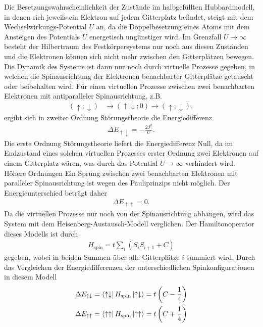 Die Besetzungswahrscheinlichkeit der Zustände im halbgefüllten Hubbardmodell, in denen sich jeweils ein Elektron auf jedem Gitterplatz befindet, steigt mit dem Wechselwirkungs-Potential $U$ an, da
die Doppelbesetzung eines Atoms mit dem Ansteigen des Potentials $U$ energetisch ungünstiger wird. Im Grenzfall $U \to \infty$ besteht der Hilbertraum des Festkörpersystems nur noch aus diesen Zuständen
und die Elektronen können sich nicht mehr zwischen den Gitterplätzen bewegen. Die Dynamik des Systems ist dann nur noch durch virtuelle Prozesse gegeben, in welchen die Spinausrichtung der Elektronen
benachbarter Gitterplätze getauscht oder beibehalten wird. Für einen virtuellen Prozesse zwischen zwei benachbarten Elektronen mit antiparalleler Spinausrichtung, z.B.
\begin{align}
  (\uparrow; \downarrow) &\to (\uparrow \downarrow ; 0) \to (\uparrow; \downarrow),
\end{align}
ergibt sich in zweiter Ordnung Störungstheorie die Energiedifferenz
\begin{align}
  \Delta E_{\uparrow \downarrow} = - \frac{2J^2}{U}.
  \label{eqn:Ediffantipar}
\end{align}
Die erste Ordnung Störungstheorie liefert die Energiedifferenz Null, da im Endzustand eines solchen virtuellen Prozesses erster Ordnung zwei Elektronen auf einem Gitterplatz wären, was durch das Potential
$U \to \infty$ verhindert wird. Höhere Ordnungen
Ein Sprung zwischen zwei benachbarten Elektronen mit paralleler Spinausrichtung ist wegen des Pauliprinzips nicht möglich.
Der Energieunterschied beträgt daher
\begin{align}
  \Delta E_{\uparrow \uparrow} = 0.
  \label{eqn:Ediffpar}
\end{align}
Da die virtuellen Prozesse nur noch von der Spinausrichtung abhängen, wird das System mit dem Heisenberg-Austausch-Modell verglichen.
Der Hamiltonoperator dieses Modells ist durch
\begin{align}
  H_\text{spin} = t \sum_{i} (S_i S_{i+1} + C)
  \label{eqn:hamiltonspincj}
\end{align}
gegeben, wobei in beiden Summen über alle Gitterplätze $i$ summiert wird. Durch das Vergleichen der Energiedifferenzen der unterschiedlichen Spinkonfigurationen in diesem Modell
\begin{align}
  \Delta E_{\uparrow \downarrow} = \bra{\uparrow \downarrow} H_\text{spin} \ket{\uparrow \downarrow} = t\left(C - \frac14\right) \\
  \Delta E_{\uparrow \uparrow} = \bra{\uparrow \uparrow} H_\text{spin} \ket{\uparrow \uparrow} = t\left(C + \frac14\right)
\end{align}
